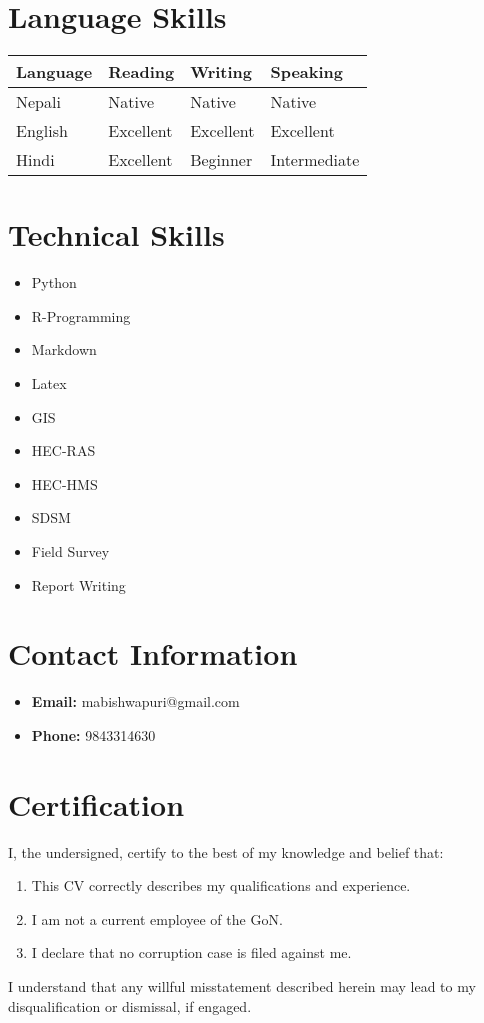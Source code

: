 \documentclass[a4paper,12pt]{article}
\begin{document}
\section*{Language Skills}
\begin{tabular}{|l|l|l|l|}
\hline
\textbf{Language} & \textbf{Reading} & \textbf{Writing} & \textbf{Speaking} \\
\hline
Nepali & Native & Native & Native \\
English & Excellent & Excellent & Excellent \\
Hindi & Excellent & Beginner & Intermediate \\
\hline
\end{tabular}

\section*{Technical Skills}
\begin{multicols}{3}
\begin{itemize}[noitemsep]
    \item Python
    \item R-Programming
    \item Markdown
    \item Latex
    \item GIS
    \item HEC-RAS
    \item HEC-HMS
    \item SDSM
    \item Field Survey
    \item Report Writing
\end{itemize}
\end{multicols}

\section*{Contact Information}
\begin{itemize}[noitemsep]
    \item \textbf{Email:} mabishwapuri@gmail.com
    \item \textbf{Phone:} 9843314630
\end{itemize}

\section*{Certification}
I, the undersigned, certify to the best of my knowledge and belief that:
\begin{enumerate}[noitemsep]
    \item This CV correctly describes my qualifications and experience.
    \item I am not a current employee of the GoN.
    \item I declare that no corruption case is filed against me.
\end{enumerate}

I understand that any willful misstatement described herein may lead to my disqualification or dismissal, if engaged.
\end{document}
